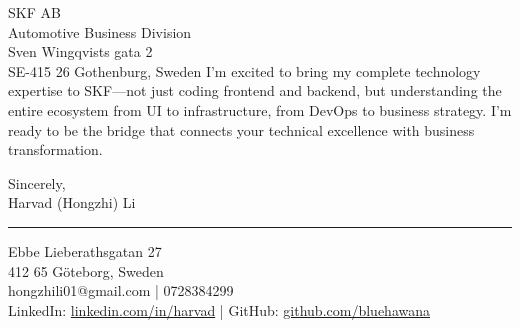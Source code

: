 \documentclass[a4paper,10pt]{article}
\begin{document}
\begin{letter}{\color{darkblue}
SKF AB\\
Automotive Business Division\\
Sven Wingqvists gata 2\\
SE-415 26 Gothenburg, Sweden}
I'm excited to bring my complete technology expertise to SKF—not just coding frontend and backend, but understanding the entire ecosystem from UI to infrastructure, from DevOps to business strategy. I'm ready to be the bridge that connects your technical excellence with business transformation.

\vspace{10pt}

\closing{
Sincerely,\\
\vspace{15pt}
Harvad (Hongzhi) Li
}

\vspace{20pt}

{\color{darkblue}\rule{\linewidth}{0.6pt}}
\vspace{4pt}

{\color{darkblue}
Ebbe Lieberathsgatan 27\\
412 65 Göteborg, Sweden\\
hongzhili01@gmail.com | 0728384299\\
LinkedIn: \href{https://www.linkedin.com/in/harvad/}{linkedin.com/in/harvad} | GitHub: \href{https://github.com/bluehawana}{github.com/bluehawana}
}

\end{letter}
\end{document}
